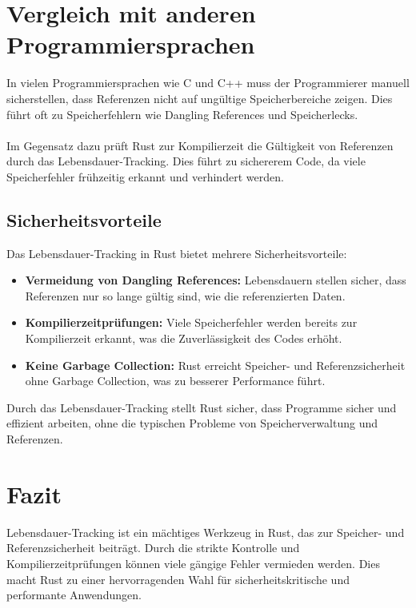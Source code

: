 \section{Vergleich mit anderen Programmiersprachen}
In vielen Programmiersprachen wie C und C++ muss der Programmierer manuell sicherstellen, dass Referenzen nicht auf ungültige Speicherbereiche zeigen. 
Dies führt oft zu Speicherfehlern wie Dangling References und Speicherlecks.\\
\\
Im Gegensatz dazu prüft Rust zur Kompilierzeit die Gültigkeit von Referenzen durch das Lebensdauer-Tracking. Dies führt zu sichererem Code, da viele Speicherfehler frühzeitig erkannt und verhindert werden.

\subsection{Sicherheitsvorteile}
Das Lebensdauer-Tracking in Rust bietet mehrere Sicherheitsvorteile:

\begin{itemize}
    \item \textbf{Vermeidung von Dangling References:} Lebensdauern stellen sicher, dass Referenzen nur so lange gültig sind, wie die referenzierten Daten.
    \item \textbf{Kompilierzeitprüfungen:} Viele Speicherfehler werden bereits zur Kompilierzeit erkannt, was die Zuverlässigkeit des Codes erhöht.
    \item \textbf{Keine Garbage Collection:} Rust erreicht Speicher- und Referenzsicherheit ohne Garbage Collection, was zu besserer Performance führt.
\end{itemize}
\noindent
Durch das Lebensdauer-Tracking stellt Rust sicher, dass Programme sicher und effizient arbeiten, ohne die typischen Probleme von Speicherverwaltung und Referenzen.

\section{Fazit}
Lebensdauer-Tracking ist ein mächtiges Werkzeug in Rust, das zur Speicher- und Referenzsicherheit beiträgt. 
Durch die strikte Kontrolle und Kompilierzeitprüfungen können viele gängige Fehler vermieden werden. Dies macht Rust zu einer hervorragenden Wahl für sicherheitskritische und performante Anwendungen.

